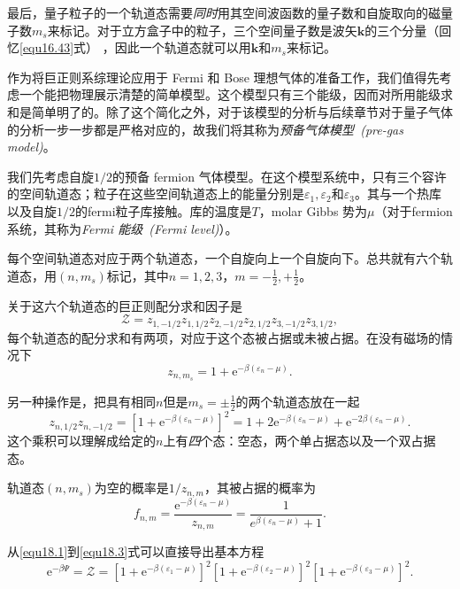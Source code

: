 最后，量子粒子的一个轨道态需要{\it 同时}用其空间波函数的量子数和自旋取向的磁量子数$m_s$来标记。对于立方盒子中的粒子，三个空间量子数是波矢$\mathbf k$的三个分量（回忆\eqref{equ16.43}式）%
%
，因此一个轨道态就可以用$\mathbf k$和$m_s$来标记。

作为将巨正则系综理论应用于 Fermi 和 Bose 理想气体的准备工作，我们值得先考虑一个能把物理展示清楚的简单模型。这个模型只有三个能级，因而对所用能级求和是简单明了的。除了这个简化之外，对于该模型的分析与后续章节对于量子气体的分析一步一步都是严格对应的，故我们将其称为{\it 预备气体模型~(pre-gas model)}。

我们先考虑自旋$1/2$的预备 fermion 气体模型。在这个模型系统中，只有三个容许的空间轨道态；粒子在这些空间轨道态上的能量分别是$\varepsilon_1,\varepsilon_2$和$\varepsilon_3$。其与一个热库以及自旋$1/2$的fermi粒子库接触。库的温度是$T$，molar Gibbs 势为$\mu$（对于fermion系统，其称为{\it Fermi 能级~(Fermi level)}）。

每个空间轨道态对应于两个轨道态，一个自旋向上一个自旋向下。总共就有六个轨道态，用$(n,m_s)$标记，其中$n=1,2,3$，$m=-\frac{1}{2},+\frac{1}{2}$。

关于这六个轨道态的巨正则配分求和因子是
\begin{equation}
\mathcal Z = z_{1,-1/2}z_{1,1/2}z_{2,-1/2}z_{2,1/2}z_{3,-1/2}z_{3,1/2},
\label{equ18.1}
\end{equation}
每个轨道态的配分求和有两项，对应于这个态被占据或未被占据。在没有磁场的情况下
\begin{equation}
z_{n,m_s}=1+\mathrm e^{-\beta(\varepsilon_n-\mu)}.
\label{equ18.2}
\end{equation}

另一种操作是，把具有相同$n$但是$m_s=\pm\frac{1}{2}$的两个轨道态放在一起
\begin{equation}
z_{n,1/2}z_{n,-1/2}=\left[1+\mathrm e^{-\beta(\varepsilon_n-\mu)}\right]^2=1+2\mathrm e^{-\beta(\varepsilon_n-\mu)}+\mathrm e^{-2\beta(\varepsilon_n-\mu)}.
\label{equ18.3}
\end{equation}
这个乘积可以理解成给定的$n$上有{\it 四}个态：空态，两个单占据态以及一个双占据态。

轨道态$(n,m_s)$为空的概率是$1/z_{n,m}$，其被占据的概率为
\begin{equation}
f_{n,m}=\frac{\mathrm e^{-\beta(\varepsilon_n-\mu)}}{z_{n,m}}=\frac{1}{e^{\beta(\varepsilon_n-\mu)}+1}.
\label{equ18.4}
\end{equation}

从\ref{equ18.1}到\ref{equ18.3}式可以直接导出基本方程
\begin{equation}
\mathrm e^{-\beta\Psi}=\mathcal Z = \left[1+\mathrm e^{-\beta(\varepsilon_1-\mu)}\right]^2\left[1+\mathrm e^{-\beta(\varepsilon_2-\mu)}\right]^2\left[1+\mathrm e^{-\beta(\varepsilon_3-\mu)}\right]^2.
\label{equ18.5}
\end{equation}

